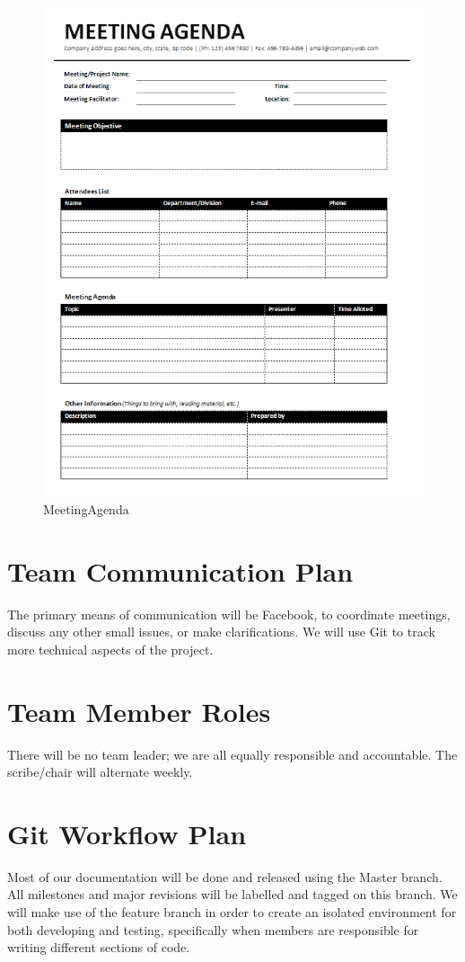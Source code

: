 \documentclass{article}
\begin{document}
\begin{figure}[htbp]
\centering
\includegraphics[scale=0.7]{MeetingAgenda.png}
\caption{MeetingAgenda}
\end{figure}


\newpage
\section{Team Communication Plan}
The primary means of communication will be Facebook, to coordinate meetings, discuss any other small issues, or make clarifications.  We will use Git to track more technical aspects of the project. 

\section{Team Member Roles}
There will be no team leader; we are all equally responsible and accountable.  The scribe/chair will alternate weekly.

\section{Git Workflow Plan}
 Most of our documentation will be done and released using the Master branch. All milestones and major revisions will be labelled and tagged on this branch. We will make use of the feature branch in order to create an isolated environment for both developing and testing, specifically when members are responsible for writing different sections of code.
\end{document}
